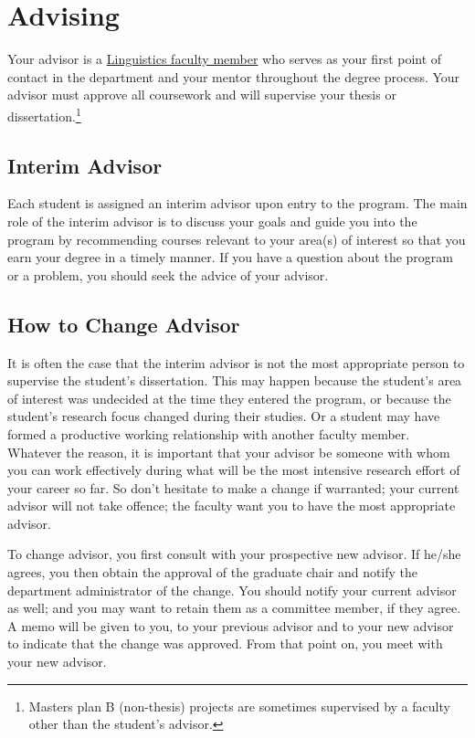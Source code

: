 \documentclass[
]{book}
\begin{document}
\hypertarget{general}{%
\chapter{Advising}\label{general}}

Your advisor is a \href{http://ling.hawaii.edu/people/core-faculty/}{Linguistics faculty member} who serves as your first point of contact in the department and your mentor throughout the degree process. Your advisor must approve all coursework and will supervise your thesis or dissertation.\footnote{Masters plan B (non-thesis) projects are sometimes supervised by a faculty other than the student's advisor.}

\hypertarget{interim-advisor}{%
\section{Interim Advisor}\label{interim-advisor}}

Each student is assigned an interim advisor upon entry to the program. The main role of the interim advisor is to discuss your goals and guide you into the program by recommending courses relevant to your area(s) of interest so that you earn your degree in a timely manner. If you have a question about the program or a problem, you should seek the advice of your advisor.

\hypertarget{how-to-change-advisor}{%
\section{How to Change Advisor}\label{how-to-change-advisor}}

It is often the case that the interim advisor is not the most appropriate person to supervise the student's dissertation. This may happen because the student's area of interest was undecided at the time they entered the program, or because the student's research focus changed during their studies. Or a student may have formed a productive working relationship with another faculty member. Whatever the reason, it is important that your advisor be someone with whom you can work effectively during what will be the most intensive research effort of your career so far. So don't hesitate to make a change if warranted; your current advisor will not take offence; the faculty want you to have the most appropriate advisor.

To change advisor, you first consult with your prospective new advisor. If he/she agrees, you then obtain the approval of the graduate chair and notify the department administrator of the change. You should notify your current advisor as well; and you may want to retain them as a committee member, if they agree. A memo will be given to you, to your previous advisor and to your new advisor to indicate that the change was approved. From that point on, you meet with your new advisor.
\end{document}
